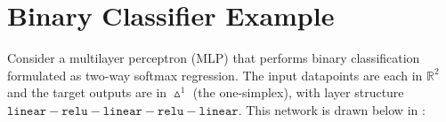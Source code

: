 



\section{Binary Classifier Example}
Consider a multilayer perceptron (MLP) that performs binary classification formulated as two-way softmax regression. The input datapoints are each in $\mathbb{R}^2$ and the target outputs are in $\vartriangle^1$ (the one-simplex), %
with layer structure $\texttt{linear}-\texttt{relu}-\texttt{linear}-\texttt{relu}-\texttt{linear}$. This network is drawn below in \fig{\ref{fig:neural_nets:simple_MLP_network2}}:

